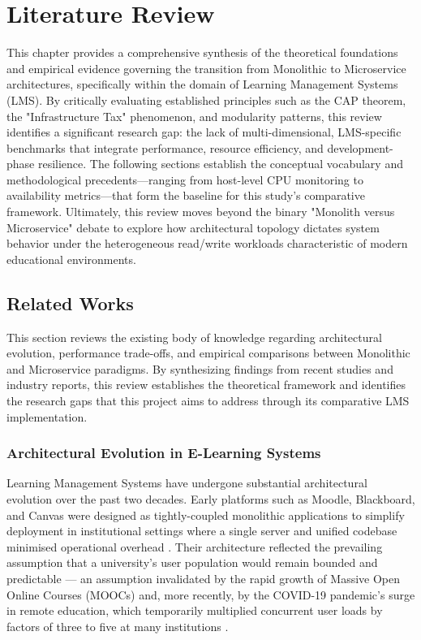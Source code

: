 \chapter{Literature Review}

This chapter provides a comprehensive synthesis of the theoretical foundations and empirical evidence governing the transition from Monolithic to Microservice architectures, specifically within the domain of Learning Management Systems (LMS). By critically evaluating established principles such as the CAP theorem, the "Infrastructure Tax" phenomenon, and modularity patterns, this review identifies a significant research gap: the lack of multi-dimensional, LMS-specific benchmarks that integrate performance, resource efficiency, and development-phase resilience. The following sections establish the conceptual vocabulary and methodological precedents—ranging from host-level CPU monitoring to availability metrics—that form the baseline for this study’s comparative framework. Ultimately, this review moves beyond the binary "Monolith versus Microservice" debate to explore how architectural topology dictates system behavior under the heterogeneous read/write workloads characteristic of modern educational environments.

\section{Related Works}

This section reviews the existing body of knowledge regarding architectural evolution, performance trade-offs, and empirical comparisons between Monolithic and Microservice paradigms. By synthesizing findings from recent studies and industry reports, this review establishes the theoretical framework and identifies the research gaps that this project aims to address through its comparative LMS implementation.

\subsection{Architectural Evolution in E-Learning Systems}

Learning Management Systems have undergone substantial architectural evolution over the past two decades. 
Early platforms such as Moodle, Blackboard, and Canvas were designed as tightly-coupled monolithic applications 
to simplify deployment in institutional settings where a single server and unified codebase minimised operational 
overhead \cite{Pia_Niemela}. Their architecture reflected the prevailing assumption that a university's 
user population would remain bounded and predictable — an assumption invalidated by the rapid growth of Massive 
Open Online Courses (MOOCs) and, more recently, by the COVID-19 pandemic's surge in remote education, which 
temporarily multiplied concurrent user loads by factors of three to five at many institutions \cite{IJACSA2023}.

